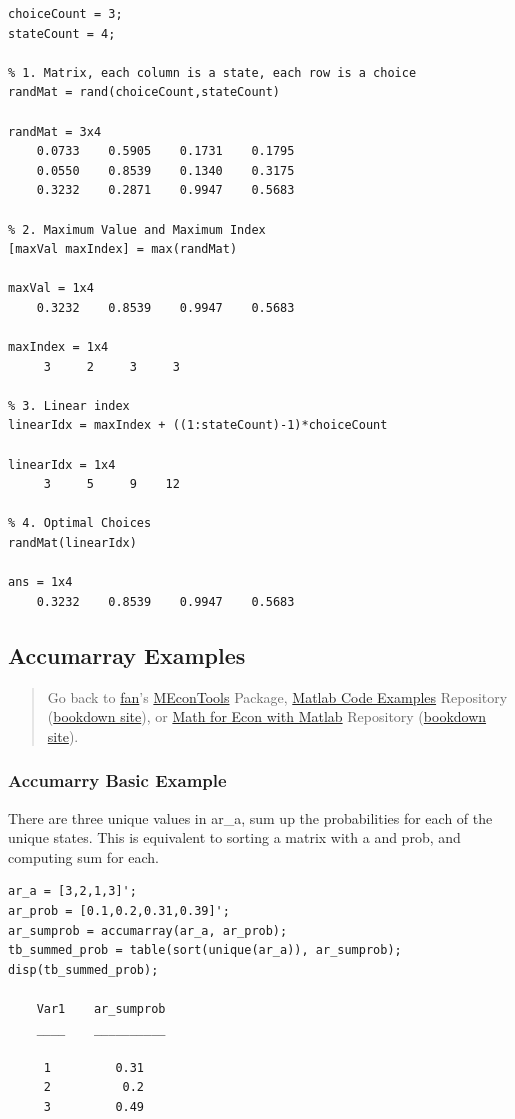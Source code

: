 \documentclass[
]{book}
\begin{document}
\begin{verbatim}
choiceCount = 3;
stateCount = 4;

% 1. Matrix, each column is a state, each row is a choice
randMat = rand(choiceCount,stateCount)

randMat = 3x4    
    0.0733    0.5905    0.1731    0.1795
    0.0550    0.8539    0.1340    0.3175
    0.3232    0.2871    0.9947    0.5683

% 2. Maximum Value and Maximum Index
[maxVal maxIndex] = max(randMat)

maxVal = 1x4    
    0.3232    0.8539    0.9947    0.5683

maxIndex = 1x4    
     3     2     3     3

% 3. Linear index
linearIdx = maxIndex + ((1:stateCount)-1)*choiceCount

linearIdx = 1x4    
     3     5     9    12

% 4. Optimal Choices
randMat(linearIdx)

ans = 1x4    
    0.3232    0.8539    0.9947    0.5683
\end{verbatim}

\hypertarget{accumarray-examples}{%
\subsection{Accumarray Examples}\label{accumarray-examples}}

\begin{quote}
Go back to \href{http://fanwangecon.github.io/}{fan}'s \href{https://fanwangecon.github.io/MEconTools/}{MEconTools} Package, \href{https://fanwangecon.github.io/M4Econ/}{Matlab Code Examples} Repository (\href{https://fanwangecon.github.io/M4Econ/bookdown}{bookdown site}), or \href{https://fanwangecon.github.io/Math4Econ/}{Math for Econ with Matlab} Repository (\href{https://fanwangecon.github.io/Math4Econ/bookdown}{bookdown site}).
\end{quote}

\hypertarget{accumarry-basic-example}{%
\subsubsection{Accumarry Basic Example}\label{accumarry-basic-example}}

There are three unique values in ar\_a, sum up the probabilities for each
of the unique states. This is equivalent to sorting a matrix with a and
prob, and computing sum for each.

\begin{verbatim}
ar_a = [3,2,1,3]';
ar_prob = [0.1,0.2,0.31,0.39]';
ar_sumprob = accumarray(ar_a, ar_prob);
tb_summed_prob = table(sort(unique(ar_a)), ar_sumprob);
disp(tb_summed_prob);

    Var1    ar_sumprob
    ____    __________

     1         0.31   
     2          0.2   
     3         0.49   
\end{verbatim}
\end{document}
